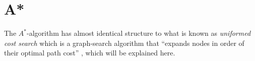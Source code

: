 \section{A*}

The $A^*$-algorithm has almost identical structure to what is known as \textit{uniformed cost search} which is a graph-search algorithm that ``expands nodes in order of their optimal path cost'' \cite{rn}, which will be explained here.

